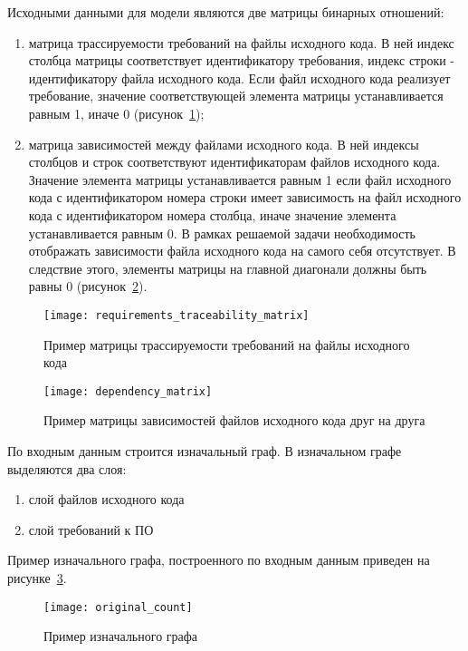 Исходными данными для модели являются две матрицы бинарных отношений:
\begin{enumerate}
    \item матрица трассируемости требований на файлы исходного кода. В ней индекс столбца матрицы соответствует идентификатору требования, индекс строки - идентификатору файла исходного кода. Если файл исходного кода реализует требование, значение соответствующей элемента матрицы устанавливается равным 1, иначе 0 (рисунок~\ref{fig:requirements_traceability_matrix});
    \item матрица зависимостей между файлами исходного кода. В ней индексы столбцов и строк соответствуют идентификаторам файлов исходного кода. Значение элемента матрицы устанавливается равным 1 если файл исходного кода с идентификатором номера строки имеет зависимость на файл исходного кода с идентификатором номера столбца, иначе значение элемента устанавливается равным 0. В рамках решаемой задачи необходимость отображать зависимости файла исходного кода на самого себя отсутствует. В следствие этого, элементы матрицы на главной диагонали должны быть равны 0 (рисунок~\ref{fig:dependency_matrix}).
\end{enumerate}

\begin{figure}[H]
    \centering
    \texttt{[image: requirements\_traceability\_matrix]}
    \caption{Пример матрицы трассируемости требований на файлы исходного кода}
    \label{fig:requirements_traceability_matrix}
\end{figure}

\begin{figure}[H]
    \centering
    \texttt{[image: dependency\_matrix]}
    \caption{Пример матрицы зависимостей файлов исходного кода друг на друга}
    \label{fig:dependency_matrix}
\end{figure}

По входным данным строится изначальный граф. В изначальном графе выделяются два слоя:
\begin{enumerate}
    \item слой файлов исходного кода
    \item слой требований к ПО
\end{enumerate}

Пример изначального графа, построенного по входным данным приведен на рисунке~\ref{fig:original_count}.

\begin{figure}[H]
    \centering
    \texttt{[image: original\_count]}
    \caption{Пример изначального графа}
    \label{fig:original_count}
\end{figure}

